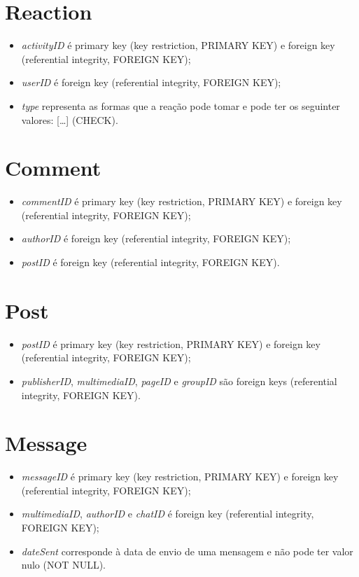 \documentclass[12pt]{report}
\begin{document}
\section{Reaction}

\begin{itemize}
    \item \textit{activityID} é primary key (key restriction, PRIMARY KEY) e foreign key (referential integrity, FOREIGN KEY);
    \item \textit{userID} é foreign key (referential integrity, FOREIGN KEY);
    \item \textit{type} representa as formas que a reação pode tomar e pode ter os seguinter valores: […] (CHECK).
\end{itemize}

\section{Comment}

\begin{itemize}
    \item \textit{commentID} é primary key (key restriction, PRIMARY KEY) e foreign key (referential integrity, FOREIGN KEY);
    \item \textit{authorID} é foreign key (referential integrity, FOREIGN KEY);
    \item \textit{postID} é foreign key (referential integrity, FOREIGN KEY).
\end{itemize}

\section{Post}

\begin{itemize}
    \item \textit{postID} é primary key (key restriction, PRIMARY KEY) e foreign key (referential integrity, FOREIGN KEY);
    \item \textit{publisherID}, \textit{multimediaID}, \textit{pageID} e \textit{groupID} são foreign keys (referential integrity, FOREIGN KEY).
\end{itemize}
    
\section{Message}

\begin{itemize}
    \item \textit{messageID} é primary key (key restriction, PRIMARY KEY) e foreign key (referential integrity, FOREIGN KEY);
    \item \textit{multimediaID}, \textit{authorID} e \textit{chatID} é foreign key (referential integrity, FOREIGN KEY);
    \item \textit{dateSent} corresponde à data de envio de uma mensagem e não pode ter valor nulo (NOT NULL).
\end{itemize}
\end{document}
